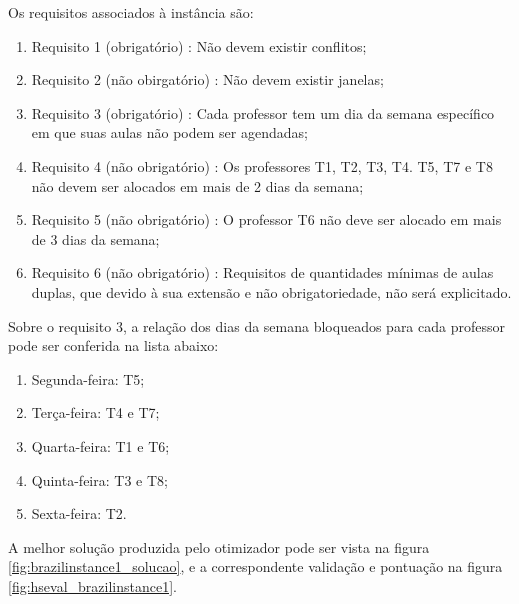 

Os requisitos associados à instância são:
\begin{enumerate}
	\item Requisito 1 (obrigatório) : Não devem existir conflitos;
	\item Requisito 2 (não obirgatório) : Não devem existir janelas;
	\item Requisito 3 (obrigatório) : Cada professor tem um dia da semana específico em que suas aulas não podem ser agendadas;
	\item Requisito 4 (não obrigatório) : Os professores T1, T2, T3, T4. T5, T7 e T8 não devem ser alocados em mais de 2 dias da semana;
	\item Requisito 5 (não obrigatório) : O professor T6 não deve ser alocado em mais de 3 dias da semana;
	\item Requisito 6 (não obrigatório) : Requisitos de quantidades mínimas de aulas duplas, que devido à sua extensão e não obrigatoriedade, não será explicitado.
\end{enumerate}

Sobre o requisito 3, a relação dos dias da semana bloqueados para cada professor pode ser conferida na lista abaixo:
\begin{enumerate}
	\item Segunda-feira: T5;
	\item Terça-feira: T4 e T7;
	\item Quarta-feira: T1 e T6;
	\item Quinta-feira: T3 e T8;
	\item Sexta-feira: T2.
\end{enumerate}

A melhor solução produzida pelo otimizador pode ser vista na figura \ref{fig:brazilinstance1_solucao}, e a correspondente validação e pontuação na figura \ref{fig:hseval_brazilinstance1}.

